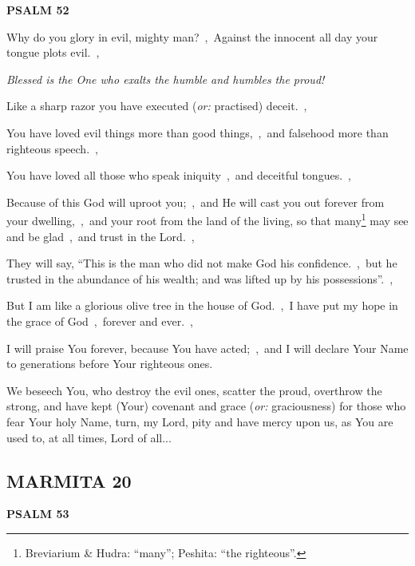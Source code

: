 \documentclass[12pt,twoside,a5paper]{article}
\newcommand{\marmita}[1]{\subsection*{MARMITA {#1}}}
\newcommand{\psalm}[1]{\textbf{PSALM {#1}}\nopagebreak}
\newcommand{\qanona}[1]{{\liturgicalhint{Qanona.} \emph{#1}}}
\newcommand{\slota}[1]{\liturgicalhint{Slota.} #1}
\newcommand{\translationoption}[1]{\emph{or:} #1}
\begin{document}
\psalm{52}

\begin{normalparskip}
  Why do you glory in evil, mighty man?~\sep\ Against the innocent all day your tongue plots evil.~\sep

  \qanona{Blessed is the One who exalts the humble and humbles the proud!}

  Like a sharp razor you have executed (\translationoption{practised}) deceit.~\sep

  You have loved evil things more than good things,~\sep\ and falsehood more than righteous speech.~\sep

  You have loved all those who speak iniquity~\sep\ and deceitful tongues.~\sep

  Because of this God will uproot you;~\sep\ and He will cast you out forever from your dwelling,~\sep\ and your root from the land of the living, so that many\footnote{Breviarium \& Hudra: ``many''; Peshita: ``the righteous''.} may see and be glad~\sep\ and trust in the Lord.~\sep

  They will say, ``This is the man who did not make God his confidence.~\sep\ but he trusted in the abundance of his wealth; and was lifted up by his possessions''.~\sep

  But I am like a glorious olive tree in the house of God.~\sep\ I have put my hope in the grace of God~\sep\ forever and ever.~\sep

  I will praise You forever, because You have acted;~\sep\ and I will declare Your Name to generations before Your righteous ones.
\end{normalparskip}

\slota{We beseech You, who destroy the evil ones, scatter the proud, overthrow the strong, and have kept (Your) covenant and grace (\translationoption{graciousness}) for those who fear Your holy Name, turn, my Lord, pity and have mercy upon us, as You are used to, at all times, Lord of all...}

\marmita{20}

\psalm{53}
\end{document}
